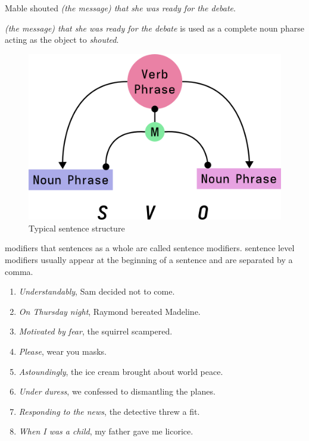 \documentclass[a4paper]{article}
\begin{document}
\begin{flushleft}
    Mable shouted \emph{(the message) that she was ready for the debate}.
\end{flushleft}

\emph{(the message) that she was ready for the debate} is used as a complete noun pharse acting as the object to \emph{shouted}.

\begin{figure}[hbt!]
    \centering
    \includegraphics[width=\textwidth]{graphics/typical-sentence-structure.png}
    \caption{Typical sentence structure}
\end{figure}

modifiers that sentences as a whole are called sentence modifiers. sentence level modifiers usually appear at the beginning of a 
sentence and are separated by a comma.

\begin{enumerate}
    \item \emph{Understandably}, Sam decided not to come.
    \item \emph{On Thursday night}, Raymond bereated Madeline.
    \item \emph{Motivated by fear}, the squirrel scampered.
    \item \emph{Please}, wear you masks.
    \item \emph{Astoundingly}, the ice cream brought about world peace.
    \item \emph{Under duress}, we confessed to dismantling the planes.
    \item \emph{Responding to the news}, the detective threw a fit.
    \item \emph{When I was a child}, my father gave me licorice.
\end{enumerate}
\end{document}
